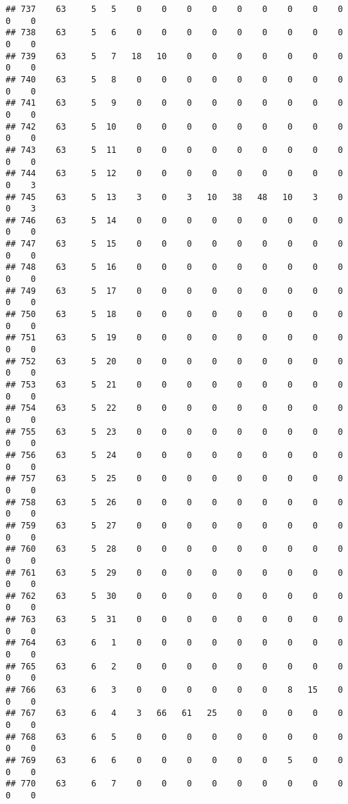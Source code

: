 \documentclass[]{article}
\begin{document}
\begin{verbatim}
## 737    63     5   5    0    0    0    0    0    0    0    0    0    0    0
## 738    63     5   6    0    0    0    0    0    0    0    0    0    0    0
## 739    63     5   7   18   10    0    0    0    0    0    0    0    0    0
## 740    63     5   8    0    0    0    0    0    0    0    0    0    0    0
## 741    63     5   9    0    0    0    0    0    0    0    0    0    0    0
## 742    63     5  10    0    0    0    0    0    0    0    0    0    0    0
## 743    63     5  11    0    0    0    0    0    0    0    0    0    0    0
## 744    63     5  12    0    0    0    0    0    0    0    0    0    0    3
## 745    63     5  13    3    0    3   10   38   48   10    3    0    0    3
## 746    63     5  14    0    0    0    0    0    0    0    0    0    0    0
## 747    63     5  15    0    0    0    0    0    0    0    0    0    0    0
## 748    63     5  16    0    0    0    0    0    0    0    0    0    0    0
## 749    63     5  17    0    0    0    0    0    0    0    0    0    0    0
## 750    63     5  18    0    0    0    0    0    0    0    0    0    0    0
## 751    63     5  19    0    0    0    0    0    0    0    0    0    0    0
## 752    63     5  20    0    0    0    0    0    0    0    0    0    0    0
## 753    63     5  21    0    0    0    0    0    0    0    0    0    0    0
## 754    63     5  22    0    0    0    0    0    0    0    0    0    0    0
## 755    63     5  23    0    0    0    0    0    0    0    0    0    0    0
## 756    63     5  24    0    0    0    0    0    0    0    0    0    0    0
## 757    63     5  25    0    0    0    0    0    0    0    0    0    0    0
## 758    63     5  26    0    0    0    0    0    0    0    0    0    0    0
## 759    63     5  27    0    0    0    0    0    0    0    0    0    0    0
## 760    63     5  28    0    0    0    0    0    0    0    0    0    0    0
## 761    63     5  29    0    0    0    0    0    0    0    0    0    0    0
## 762    63     5  30    0    0    0    0    0    0    0    0    0    0    0
## 763    63     5  31    0    0    0    0    0    0    0    0    0    0    0
## 764    63     6   1    0    0    0    0    0    0    0    0    0    0    0
## 765    63     6   2    0    0    0    0    0    0    0    0    0    0    0
## 766    63     6   3    0    0    0    0    0    0    8   15    0    0    0
## 767    63     6   4    3   66   61   25    0    0    0    0    0    0    0
## 768    63     6   5    0    0    0    0    0    0    0    0    0    0    0
## 769    63     6   6    0    0    0    0    0    0    5    0    0    0    0
## 770    63     6   7    0    0    0    0    0    0    0    0    0    0    0

\end{verbatim}
\end{document}
